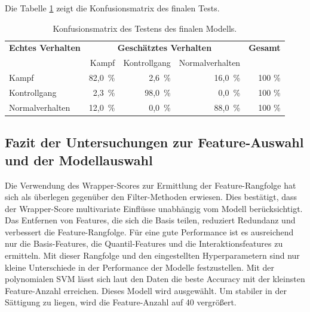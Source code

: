Die Tabelle \ref{tab:KonfMatr} zeigt die Konfusionsmatrix des finalen Tests.

\begin{table}[htbp]
    \centering
    \caption{Konfusionsmatrix des Testens des finalen Modells.}
    \label{tab:KonfMatr}
    \begin{tabular}{l|rrr|r}
        \toprule
        \multirow{1}{*}{\textbf{Echtes Verhalten}} & \multicolumn{3}{c|}{\textbf{Geschätztes Verhalten}} & {\textbf{Gesamt}}\\
         & Kampf & Kontrollgang & Normalverhalten & \\
        \midrule
        Kampf                & 82,0\, \% &  2,6\, \% & 16,0\, \% & 100 \%\\
        Kontrollgang         &  2,3\, \% & 98,0\, \% &  0,0\, \% & 100 \%\\
        Normalverhalten      & 12,0\, \% &  0,0\, \% & 88,0\, \% & 100 \%\\
        \bottomrule
    \end{tabular}
\end{table}

\clearpage
\subsection{Fazit der Untersuchungen zur Feature-Auswahl und der Modellauswahl}
Die Verwendung des Wrapper-Scores zur Ermittlung der Feature-Rangfolge hat sich als überlegen gegenüber den Filter-Methoden erwiesen. Dies bestätigt, dass der Wrapper-Score multivariate Einflüsse unabhängig vom Modell berücksichtigt. Das Entfernen von Features, die sich die Basis teilen, reduziert Redundanz und verbessert die Feature-Rangfolge. Für eine gute Performance ist es ausreichend nur die Basis-Features, die Quantil-Features und die Interaktionsfeatures zu ermitteln. Mit dieser Rangfolge und den eingestellten Hyperparametern sind nur kleine Unterschiede in der Performance der Modelle festzustellen. Mit der polynomialen SVM lässt sich laut den Daten die beste Accuracy mit der kleinsten Feature-Anzahl erreichen. Dieses Modell wird ausgewählt. Um stabiler in der Sättigung zu liegen, wird die Feature-Anzahl auf 40 vergrößert.